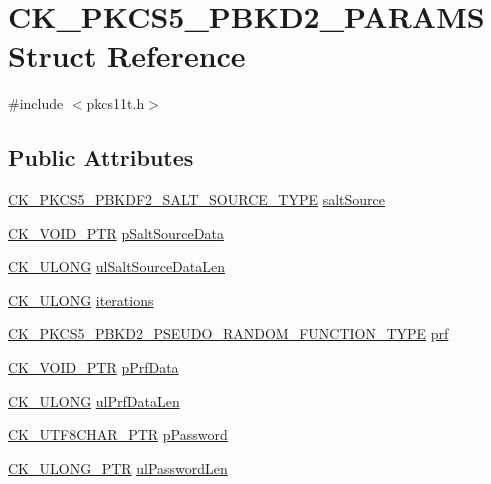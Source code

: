 \hypertarget{struct_c_k___p_k_c_s5___p_b_k_d2___p_a_r_a_m_s}{}\section{C\+K\+\_\+\+P\+K\+C\+S5\+\_\+\+P\+B\+K\+D2\+\_\+\+P\+A\+R\+A\+MS Struct Reference}
\label{struct_c_k___p_k_c_s5___p_b_k_d2___p_a_r_a_m_s}


{\ttfamily \#include $<$pkcs11t.\+h$>$}

\subsection*{Public Attributes}
\begin{DoxyCompactItemize}
\item 
\hyperlink{pkcs11t_8h_a0c6415aaa5475702cc31fa9d46b2d907}{C\+K\+\_\+\+P\+K\+C\+S5\+\_\+\+P\+B\+K\+D\+F2\+\_\+\+S\+A\+L\+T\+\_\+\+S\+O\+U\+R\+C\+E\+\_\+\+T\+Y\+PE} \hyperlink{struct_c_k___p_k_c_s5___p_b_k_d2___p_a_r_a_m_s_ad76815cc8a8629dda668e8073708b692}{salt\+Source}
\item 
\hyperlink{pkcs11t_8h_ace49359127edfc5665608140005b9a96}{C\+K\+\_\+\+V\+O\+I\+D\+\_\+\+P\+TR} \hyperlink{struct_c_k___p_k_c_s5___p_b_k_d2___p_a_r_a_m_s_abbfdc94b0dcb4495e761e5fb924e7ee5}{p\+Salt\+Source\+Data}
\item 
\hyperlink{pkcs11t_8h_a35181858a3b7a0a81f49d180d8f446ef}{C\+K\+\_\+\+U\+L\+O\+NG} \hyperlink{struct_c_k___p_k_c_s5___p_b_k_d2___p_a_r_a_m_s_a279cb440e92dea8685aee3533dae51ab}{ul\+Salt\+Source\+Data\+Len}
\item 
\hyperlink{pkcs11t_8h_a35181858a3b7a0a81f49d180d8f446ef}{C\+K\+\_\+\+U\+L\+O\+NG} \hyperlink{struct_c_k___p_k_c_s5___p_b_k_d2___p_a_r_a_m_s_a76af9633891211b81563616e79a54d70}{iterations}
\item 
\hyperlink{pkcs11t_8h_a9edb0f86d6fcfd4e70fee08deb332095}{C\+K\+\_\+\+P\+K\+C\+S5\+\_\+\+P\+B\+K\+D2\+\_\+\+P\+S\+E\+U\+D\+O\+\_\+\+R\+A\+N\+D\+O\+M\+\_\+\+F\+U\+N\+C\+T\+I\+O\+N\+\_\+\+T\+Y\+PE} \hyperlink{struct_c_k___p_k_c_s5___p_b_k_d2___p_a_r_a_m_s_a1ac904b48a043a9780cb5764bbde2917}{prf}
\item 
\hyperlink{pkcs11t_8h_ace49359127edfc5665608140005b9a96}{C\+K\+\_\+\+V\+O\+I\+D\+\_\+\+P\+TR} \hyperlink{struct_c_k___p_k_c_s5___p_b_k_d2___p_a_r_a_m_s_a6920d5b2e9b625d38df19301f6bad37f}{p\+Prf\+Data}
\item 
\hyperlink{pkcs11t_8h_a35181858a3b7a0a81f49d180d8f446ef}{C\+K\+\_\+\+U\+L\+O\+NG} \hyperlink{struct_c_k___p_k_c_s5___p_b_k_d2___p_a_r_a_m_s_a5e835d20bdcc45dd218753b40aec7d6b}{ul\+Prf\+Data\+Len}
\item 
\hyperlink{pkcs11t_8h_af25c3841a3f605e6414f4c9ef5592ed9}{C\+K\+\_\+\+U\+T\+F8\+C\+H\+A\+R\+\_\+\+P\+TR} \hyperlink{struct_c_k___p_k_c_s5___p_b_k_d2___p_a_r_a_m_s_a19326715c9a2b4896529cae3ca5cdd12}{p\+Password}
\item 
\hyperlink{pkcs11t_8h_af18ced3aa6adcd9f76ae8c132ed2eeb9}{C\+K\+\_\+\+U\+L\+O\+N\+G\+\_\+\+P\+TR} \hyperlink{struct_c_k___p_k_c_s5___p_b_k_d2___p_a_r_a_m_s_a26b94cdd7ed68afb00f08a32eaf1ec18}{ul\+Password\+Len}
\end{DoxyCompactItemize}


